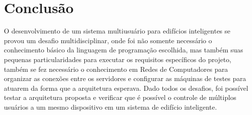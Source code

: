 \chapter{Conclusão}
\label{conclusao}

O desenvolvimento de um sistema multiusuário para edifícios inteligentes se provou um desafio multidisciplinar,
onde foi não somente necessário o conhecimento básico da linguagem de programação escolhida, mas também suas pequenas
particularidades para executar os requisitos específicos do projeto, também se fez necessário o conhecimento em Redes de Computadores 
para organizar as conexões entre os servidores e configurar as máquinas de testes para atuarem da forma que a arquitetura esperava.
Dado todos os desafios, foi possível testar a arquitetura proposta e verificar que é possível o controle de múltiplos usuários
a um mesmo dispositivo em um sistema de edifício inteligente.